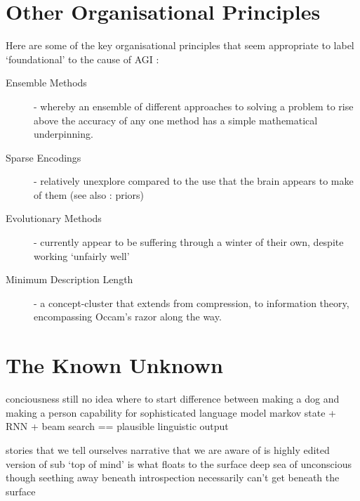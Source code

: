 \documentclass[citeauthoryear]{llncs}
\begin{document}
\section{Other Organisational Principles}

Here are some of the key organisational principles that seem appropriate 
to label `foundational' to the cause of AGI :
\begin{description}
\item[Ensemble Methods] - whereby an ensemble of different approaches to solving a problem to rise above the accuracy 
of any one method has a simple mathematical underpinning.  
\item[Sparse Encodings] - relatively unexplore compared to the use that the brain appears to make of them
(see also : priors)
\item[Evolutionary Methods] - currently appear to be suffering through a winter of their own, 
despite working `unfairly well'
\item[Minimum Description Length] - a concept-cluster that extends from compression, 
to information theory, encompassing Occam's razor along the way.
\end{description}


\section{The Known Unknown}

conciousness 
  still no idea where to start
  difference between making a dog and making a person
    capability for sophisticated language model
      markov state + RNN + beam search == plausible linguistic output
  
  stories that we tell ourselves
    narrative that we are aware of is highly edited version of sub
      `top of mind' is what floats to the surface
      deep sea of unconscious though seething away beneath
  introspection necessarily can't get beneath the surface
\end{document}
